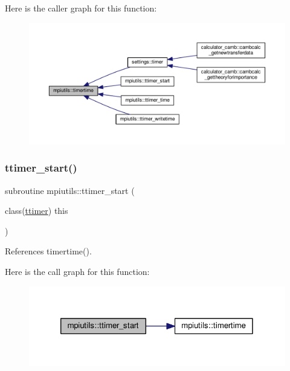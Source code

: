 Here is the caller graph for this function\+:
\nopagebreak
\begin{figure}[H]
\begin{center}
\leavevmode
\includegraphics[width=350pt]{namespacempiutils_a22d9c100b7422621acc997902a9856f7_icgraph}
\end{center}
\end{figure}
\mbox{\label{namespacempiutils_af115575f9cb5cff0693d705e9f6b4704}} 
\subsubsection{\texorpdfstring{ttimer\+\_\+start()}{ttimer\_start()}}
{\footnotesize\ttfamily subroutine mpiutils\+::ttimer\+\_\+start (\begin{DoxyParamCaption}\item[{class(\mbox{\hyperlink{structmpiutils_1_1ttimer}{ttimer}})}]{this }\end{DoxyParamCaption})}



References timertime().

Here is the call graph for this function\+:
\nopagebreak
\begin{figure}[H]
\begin{center}
\leavevmode
\includegraphics[width=320pt]{namespacempiutils_af115575f9cb5cff0693d705e9f6b4704_cgraph}
\end{center}
\end{figure}
\mbox{\label{namespacempiutils_a45301d4a23c7b66f94ef24ded2062d8d}} 
